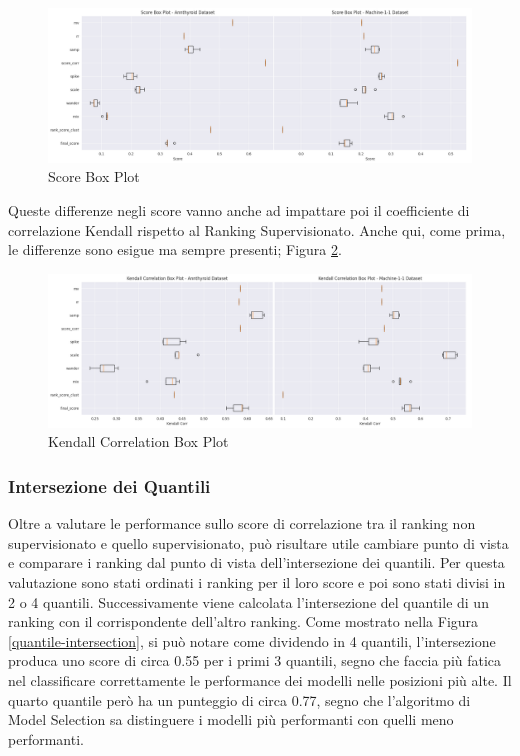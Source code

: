 \begin{figure}[t]
	\centering
	\includegraphics[width=15cm, scale=1]{images/score_box}
	\caption{Score Box Plot}
	\label{score-box}
	
\end{figure}

Queste differenze negli score vanno anche ad impattare poi il coefficiente di correlazione Kendall rispetto al Ranking Supervisionato. Anche qui, come prima, le differenze sono esigue ma sempre presenti; Figura \ref{kendall-box}.

\begin{figure}[t]
	\centering
	\includegraphics[width=15cm, scale=1]{images/kendall_box}
	\caption{Kendall Correlation Box Plot}
	\label{kendall-box}
		
\end{figure}


\subsubsection{Intersezione dei Quantili}
Oltre a valutare le performance sullo score di correlazione tra il ranking non supervisionato e quello supervisionato, può risultare utile cambiare punto di vista e comparare i ranking dal punto di vista dell'intersezione dei quantili.
Per questa valutazione sono stati ordinati i ranking per il loro score e poi sono stati divisi in 2 o 4 quantili. Successivamente viene calcolata l'intersezione del quantile di un ranking con il corrispondente dell'altro ranking.
Come mostrato nella Figura \ref{quantile-intersection}, si può notare come dividendo in 4 quantili, l'intersezione produca uno score di circa 0.55 per i primi 3 quantili, segno che faccia più fatica nel classificare correttamente le performance dei modelli nelle posizioni più alte. Il quarto quantile però ha un punteggio di circa 0.77, segno che l'algoritmo di Model Selection sa distinguere i modelli più performanti con quelli meno performanti.

